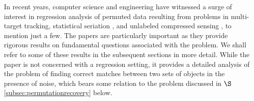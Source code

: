 \documentclass[11pt]{article}
\def\x{\mathbf{x}}
\begin{document}
In recent years, computer science and engineering have witnessed a surge of interest in regression analysis of permuted data resulting from problems in multi-target tracking,  statistical seriation \cite{Flammarion16}, and unlabeled compressed sensing \cite{Unnikrishnan2015}, to mention just a few. The papers \cite{Unnikrishnan2015, Pananjady2016, Pananjady2017} are particularly important as they provide rigorous results on fundamental questions associated with the problem. We shall refer to some of these results in the subsequent sections in more detail. While the paper \cite{Collier2016} is not concerned with a regression setting, it provides a detailed analysis of the problem of finding correct matches between two sets of objects in the presence of noise, which bears some relation to the problem discussed in $\S$\ref{subsec:permutationrecovery} below.  

  
\end{document}
